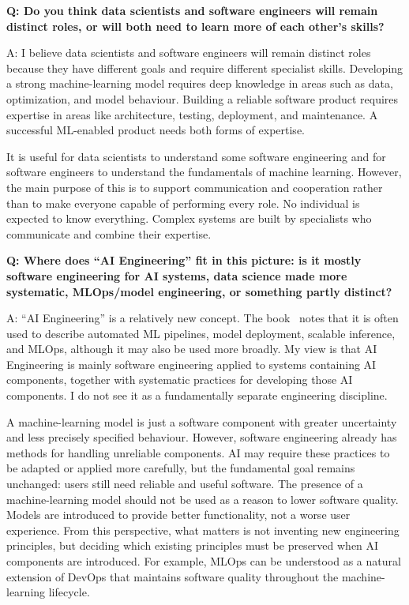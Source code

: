\noindent\textbf{Q: Do you think data scientists and software engineers will remain distinct roles, or
will both need to learn more of each other’s skills?}

A: 
I believe data scientists and software engineers will remain distinct roles because they have different goals and require different specialist skills. Developing a strong machine-learning model requires deep knowledge in areas such as data, optimization, and model behaviour. Building a reliable software product requires expertise in areas like architecture, testing, deployment, and maintenance. A successful ML-enabled product needs both forms of expertise.

It is useful for data scientists to understand some software engineering and for software engineers to understand the fundamentals of machine learning. However, the main purpose of this is to support communication and cooperation rather than to make everyone capable of performing every role. No individual is expected to know everything. Complex systems are built by specialists who communicate and combine their expertise.


\noindent\textbf{Q: Where does ``AI Engineering'' fit in this picture: is it mostly software engineering for AI systems, data science made more systematic, MLOps/model engineering, or something
partly distinct? }

A: 
``AI Engineering'' is a relatively new concept. The book~\cite{kastner2025machine} notes that it is often used to describe automated ML pipelines, model deployment, scalable inference, and MLOps, although it may also be used more broadly. My view is that AI Engineering is mainly software engineering applied to systems containing AI components, together with systematic practices for developing those AI components. I do not see it as a fundamentally separate engineering discipline.

A machine-learning model is just a software component with greater uncertainty and less precisely specified behaviour. However, software engineering already has methods for handling unreliable components. AI may require these practices to be adapted or applied more carefully, but the fundamental goal remains unchanged: users still need reliable and useful software. The presence of a machine-learning model should not be used as a reason to lower software quality. Models are introduced to provide better functionality, not a worse user experience.
From this perspective, what matters is not inventing new engineering principles, but deciding which existing principles must be preserved when AI components are introduced. For example, MLOps can be understood as a natural extension of DevOps that maintains software quality throughout the machine-learning lifecycle.


